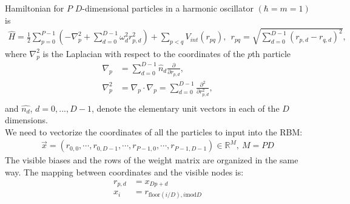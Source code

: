 \documentclass[12pt]{article}
\begin{document}
\noindent Hamiltonian for $P$ $D$-dimensional particles in a harmonic oscillator $(\hbar = m = 1)$ is
\begin{align*}
\hat{H} = \frac{1}{2} \sum_{p = 0}^{P-1} \left( -\nabla_p^2 + \sum_{d=0}^{D-1} \omega_d^2 r_{p,d}^2 \right) + \sum_{p<q} V_{int} (r_{pq}), \ \ r_{pq} = \sqrt{ \sum_{d=0}^{D-1} (r_{p,d}-r_{q,d})^2 },
\end{align*}
\noindent where $\nabla_p^2$ is the Laplacian with respect to the coordinates of the $p$th particle
\begin{align*}
\nabla_p &= \sum_{d=0}^{D-1} \hat{n}_d \frac{\partial}{\partial r_{p,d}},\\
\nabla_p^2 &= \nabla_p \cdot \nabla_p = \sum_{d=0}^{D-1} \frac{\partial^2}{\partial r_{p,d}^2},\\
\end{align*}
\noindent and $\hat{n_d}$, $d = 0, ..., D-1$, denote the elementary unit vectors in each of the $D$ dimensions.\\


\noindent We need to vectorize the coordinates of all the particles to input into the RBM:
\begin{align*}
\vec{x} = ( r_{0,0}, \cdots, r_{0,D-1}, \cdots, r_{P-1,0}, \cdots, r_{P-1,D-1} ) \in \mathbb{R}^M, \ M = PD
\end{align*}
\noindent The visible biases and the rows of the weight matrix are organized in the same way. The mapping between coordinates and the visible nodes is:
\begin{align*}
r_{p,d} &= x_{Dp+d}\\
x_i &= r_{\text{floor}(i/D), i \text{mod} D}
\end{align*}
\end{document}
